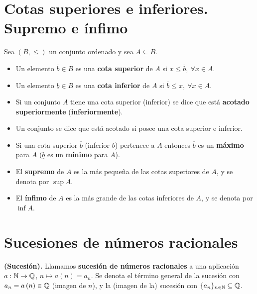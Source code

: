 \section{Cotas superiores e inferiores. Supremo e ínfimo}
\begin{defi}
    Sea $\left( B, \leq \right) $ un conjunto ordenado y sea $A\subseteq B$.
    \begin{itemize}[itemsep = -2pt]
        \item Un elemento $\overline{b}\in B$ es una \textbf{cota superior} de $A$ si $x\leq\overline{b},\ \forall x\in A$.
        \item Un elemento $\underline{b}\in B$ es una \textbf{cota inferior} de $A$ si $\overline{b}\leq x,\ \forall x\in A$.
        \item Si un conjunto $A$ tiene una cota superior (inferior) se dice que está \textbf{acotado superiormente} (\textbf{inferiormente}).
        \item Un conjunto se dice que está acotado si posee una cota superior e inferior.
        \item Si una cota superior $\overline{b}$ (inferior $\underline{b}$) pertenece a $A$ entonces $\overline{b}$ es un \textbf{máximo} para $A$ ($\underline{b}$ es un \textbf{mínimo} para $A$).
        \item El \textbf{supremo} de $A$ es la más pequeña de las cotas superiores de $A$, y se denota por $\sup A$.
        \item El \textbf{ínfimo} de $A$ es la más grande de las cotas inferiores de $A$, y se denota por $\inf A$.
    \end{itemize}
\end{defi}


\section{Sucesiones de números racionales}
\begin{defi}
    \textbf{(Sucesión).} Llamamos \textbf{sucesión de números racionales} a una aplicación $a:\mathbb{N}\to\mathbb{Q}$, $n\mapsto a\left( n \right) = a_n$. Se denota el término general de la sucesión con $a_n = a\left( n \right) \in\mathbb{Q}$ (imagen de $n$), y la (imagen de la) sucesión con $\{a_n\}_{n\in\mathbb{N}}\subseteq\mathbb{Q}$.
\end{defi}

